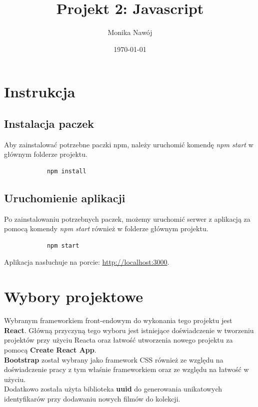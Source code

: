 \documentclass[
    12pt, %
]{fphw}
\title{Projekt 2: Javascript} %
\author{Monika Nawój} %
\date{\today} %
\institute{Politechnika Warszawska \\ Wydział Elektroniki i Technik Informacyjnych} %
\begin{document}
    \maketitle %

    \section{Instrukcja}
    \subsection{Instalacja paczek}
    Aby zainstalować potrzebne paczki npm, należy uruchomić komendę \textit{npm start} w głównym folderze projektu.
        \begin{lstlisting}
            npm install
        \end{lstlisting}
    \subsection{Uruchomienie aplikacji}
    Po zainstalowaniu potrzebnych paczek, możemy uruchomić serwer z aplikacją za pomocą komendy \textit{npm start}
    również w folderze głównym projektu.
    \begin{lstlisting}
            npm start
    \end{lstlisting}
    Aplikacja nasłuchuje na porcie: \url{http://localhost:3000}.
    \section{Wybory projektowe}
    Wybranym frameworkiem front-endowym do wykonania tego projektu jest \textbf{React}.
    Główną przyczyną tego wyboru jest istniejące doświadczenie w tworzeniu
    projektów przy użyciu Reacta oraz łatwość utworzenia nowego projektu za pomocą \textbf{Create React App}.
    \\
    \textbf{Bootstrap} został wybrany jako framework CSS również ze względu na doświadczenie
    pracy z tym właśnie frameworkiem oraz ze względu na łatwość w użyciu.
    \\
    Dodatkowo została użyta biblioteka \textbf{uuid} do generowania unikatowych identyfikarów przy dodawaniu
    nowych filmów do kolekcji.
\end{document}
